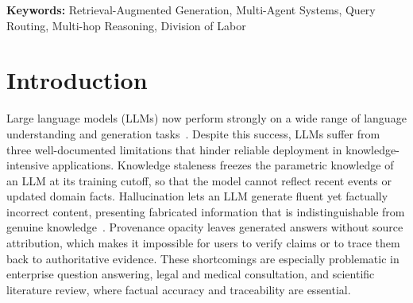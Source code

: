 \documentclass[11pt,a4paper]{article}
\newcommand{\sys}{\textsc{CollaRAG}}
\begin{document}
\begin{abstract}
On six QA benchmarks spanning single-hop (NQ, PopQA), multi-hop (HotpotQA, 2WikiMultiHopQA, MuSiQue), and long-form summarization (ASQA) tasks, \sys{} outperforms nine baselines, including the strongest graph-hybrid baseline HippoRAG2~\citep{gutierrez2025hipporag2}, under both the Qwen3-8B and Qwen3-32B backbones.
The largest gains are observed on ASQA ($+7.2$ F1 at Qwen3-8B and $+7.4$ F1 at Qwen3-32B), where no baseline runs a dedicated aggregation pipeline; on the factoid and multi-hop sets, the gains range from $+1.8$ to $+5.7$ F1 (Qwen3-8B) and are driven by intent-aware routing to specialist agents equipped with graph-grounded reasoning and structured reflection.
Ablation studies confirm that intent-aware routing is the single most impactful component, contributing $5.9$--$12.2$ EM points when it is removed.
\end{abstract}

\noindent\textbf{Keywords:} Retrieval-Augmented Generation, Multi-Agent Systems, Query Routing, Multi-hop Reasoning, Division of Labor

\section{Introduction}
\label{sec:intro}


Large language models (LLMs) now perform strongly on a wide range of language understanding and generation tasks~\citep{wei2022chain}.
Despite this success, LLMs suffer from three well-documented limitations that hinder reliable deployment in knowledge-intensive applications.
Knowledge staleness freezes the parametric knowledge of an LLM at its training cutoff, so that the model cannot reflect recent events or updated domain facts.
Hallucination lets an LLM generate fluent yet factually incorrect content, presenting fabricated information that is indistinguishable from genuine knowledge~\citep{gao2024rag_survey}.
Provenance opacity leaves generated answers without source attribution, which makes it impossible for users to verify claims or to trace them back to authoritative evidence.
These shortcomings are especially problematic in enterprise question answering, legal and medical consultation, and scientific literature review, where factual accuracy and traceability are essential.
\end{document}
